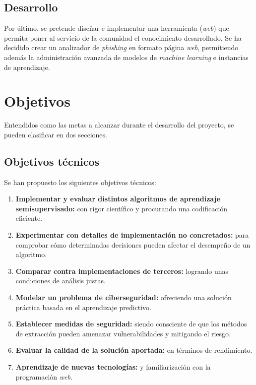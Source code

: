\subsection{Desarrollo}

Por último, se pretende diseñar e implementar una herramienta (\textit{web}) que permita poner al servicio de la comunidad el conocimiento desarrollado. Se ha decidido crear un analizador de \textit{phishing} en formato página \textit{web}, permitiendo además la administración avanzada de modelos de \textit{machine learning} e instancias de aprendizaje.

\section{Objetivos}

Entendidos como las metas a alcanzar durante el desarrollo del proyecto, se pueden clasificar en dos secciones.

\subsection{Objetivos técnicos}
\label{Objetivos técnicos}

Se han propuesto los siguientes objetivos técnicos:

\begin{enumerate}
	\item \textbf{Implementar y evaluar distintos algoritmos de aprendizaje semisupervisado:} con rigor científico y procurando una codificación eficiente.
	\item \textbf{Experimentar con detalles de implementación no concretados:} para comprobar cómo determinadas decisiones pueden afectar el desempeño de un algoritmo.
	\item \textbf{Comparar contra implementaciones de terceros:} logrando unas condiciones de análisis justas.
	\item \textbf{Modelar un problema de ciberseguridad:} ofreciendo una solución práctica basada en el aprendizaje predictivo.
	\item \textbf{Establecer medidas de seguridad:} siendo consciente de que los métodos de extracción pueden amenazar vulnerabilidades y mitigando el riesgo.
	\item \textbf{Evaluar la calidad de la solución aportada:} en términos de rendimiento.
	\item \textbf{Aprendizaje de nuevas tecnologías:} y familiarización con la programación \textit{web}.
	
\end{enumerate}

